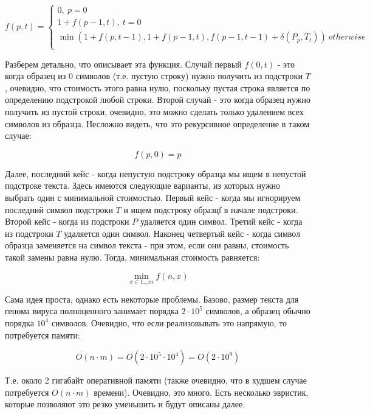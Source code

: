 \documentclass[11pt,a4paper,oneside]{article}
\begin{document}
\begin{equation}
\label{eq:cost}
	f(p,t) = \begin{cases}
	0,\ p = 0\\
	1+f(p-1,t),\ t = 0\\
	\min(1+f(p,t-1), 1+f(p-1,t), f(p-1,t-1)+\delta(P_p,T_t) )\ otherwise\\
	\end{cases} 
\end{equation}

Разберем детально, что описывает эта функция. Случай первый $f(0,t)$ - это когда образец из 0 символов (т.е. пустую строку) нужно получить из подстроки $T$, очевидно, что стоимость этого равна нулю, поскольку пустая строка является по определению подстрокой любой строки. Второй случай - это когда образец нужно получить из пустой строки, очевидно, это можно сделать только удалением всех символов из образца. Несложно видеть, что это рекурсивное определение в таком случае:

\begin{equation}
	f(p,0) = p
\end{equation}

Далее, последний кейс - когда непустую подстроку образца мы ищем в непустой подстроке текста. Здесь имеются следующие варианты, из которых нужно выбрать один с минимальной стоимостью. Первый кейс - когда мы игнорируем последний символ подстроки $T$ и ищем подстроку образцf в начале подстроки. Второй кейс - когда из подстроки $P$ удаляется один символ. Третий кейс - когда из подстроки $T$ удаляется один символ. Наконец четвертый кейс - когда символ образца заменяется на символ текста - при этом, если они равны, стоимость такой замены равна нулю. Тогда, минимальная стоимость равняется:

\begin{equation}
	\min_{x\in 1\ldots m} f(n,x)
\end{equation}

Сама идея проста, однако есть некоторые проблемы. Базово, размер текста для генома вируса полноценного занимает порядка $2\cdot 10^5$ символов, а образец обычно порядка $10^4$ символов. Очевидно, что если реализовывать это напрямую, то потребуется памяти:

\begin{equation}
	O(n\cdot m) = O(2\cdot 10^5\cdot 10^4) = O(2\cdot 10^9)
\end{equation}

Т.е. около 2 гигабайт оперативной памяти (также очевидно, что в худшем случае потребуется $O(n\cdot m)$ времени). Очевидно, это много. Есть несколько эвристик, которые позволяют это резко уменьшить и будут описаны далее.
\end{document}
